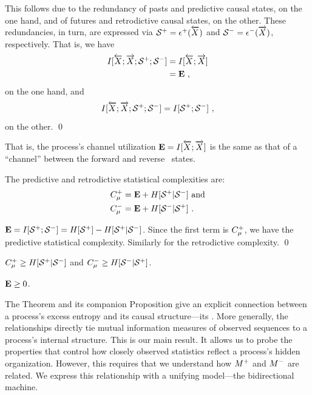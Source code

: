 \begin{ProThe}
This follows due to the redundancy of pasts and predictive causal states, on
the one hand, and of futures and retrodictive causal states, on the other.
These redundancies, in turn, are expressed via
${\mathcal{S}}^{+} = \epsilon^{+}(\overleftarrow {{X}})$ and
${\mathcal{S}}^{-} = \epsilon^{-}(\overrightarrow{{X}})$, respectively. That is, we have
\begin{align}
I[\overleftarrow {{X}};\overrightarrow{{X}};{\mathcal{S}}^{+};{\mathcal{S}}^{-}]
	& = I[\overleftarrow {{X}};\overrightarrow{{X}}] \nonumber \\
	& = {\bf E} ~,
\end{align}
on the one hand, and
\begin{equation}
I[\overleftarrow {{X}};\overrightarrow{{X}};{\mathcal{S}}^{+};{\mathcal{S}}^{-}]
	= I[{\mathcal{S}}^{+};{\mathcal{S}}^{-}] ~,
\end{equation}
on the other.
\qed
\end{ProThe}

That is, the process's channel utilization \mbox{${\bf E} = I[\overleftarrow {{X}};\overrightarrow{{X}}]$}
is the same as that of a ``channel'' between the forward and reverse
\eM\ states.

\begin{Prop}
The predictive and retrodictive statistical complexities are:
\begin{align}
\label{FutureCmuReln}
C_\mu^{+} &= {\bf E} + H[{\mathcal{S}}^{+}|{\mathcal{S}}^{-}]
  \mathrm{~and} \\
\label{PastCmuReln}
C_\mu^{-} &= {\bf E} + H[{\mathcal{S}}^{-}|{\mathcal{S}}^{+}] ~.
\end{align}
\end{Prop}
    
\begin{ProProp}
${\bf E} = I[{\mathcal{S}}^{+};{\mathcal{S}}^{-}] =
H[{\mathcal{S}}^{+}] - H[{\mathcal{S}}^{+}|{\mathcal{S}}^{-}]$.
Since the first term is $C_\mu^{+}$, we have the predictive
statistical complexity. Similarly for the retrodictive complexity.
\qed
\end{ProProp}
    
\begin{Cor}
$C_\mu^{+} \geq H[{\mathcal{S}}^{+}|{\mathcal{S}}^{-}]$ and 
$C_\mu^{-} \geq H[{\mathcal{S}}^{-}|{\mathcal{S}}^{+}]$.
\end{Cor}
    
\begin{ProCor}
${\bf E} \geq 0$.
\end{ProCor}
    
The Theorem and its companion Proposition give an explicit connection between
a process's excess entropy and its causal structure---its \eMs. More generally,
the relationships directly tie mutual information measures of observed
sequences to a process's internal structure. This is our main result. It allows
us to probe the properties that control how closely observed statistics reflect
a process's hidden organization. However, this requires that we understand how 
${M}^{+}$ and ${M}^{-}$ are related. We express this relationship with a unifying
model---the bidirectional machine.

